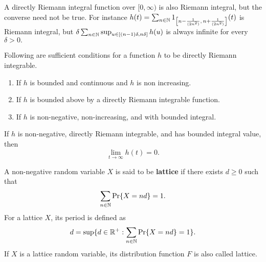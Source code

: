 \documentclass[a4paper,10pt,english]{article}
\begin{document}
A directly Riemann integral function over $[0,\infty)$ is also Riemann integral, but the converse need not be true. For instance $h(t) = \sum_{n\in\mathbb{N}}1_{\left[n-\frac{1}{(2n^2)},\,n+\frac{1}{(2n^2)}\right]}(t)$ is Riemann integral, but $\delta \sum_{n \in \mathbb{N}}\sup_{ u \in [(n-1)\delta,n\delta]}h(u)$ is always infinite for every $\delta>0.$
\begin{prop}%
Following are sufficient conditions for a function $h$ to be directly Riemann integrable.
  \begin{enumerate}
  \item If $h$ is bounded and continuous and $h$ is non increasing. 
  \item If $h$ is bounded above by a directly Riemann integrable function.
	\item If $h$ is non-negative, non-increasing, and with bounded integral.
  \end{enumerate}
\end{prop}
\begin{prop} If $h$ is non-negative, directly Riemann integrable, and has bounded integral value, then 
\begin{equation*}
\lim_{t \rightarrow \infty} h(t)=0.
\end{equation*}
\end{prop}

A non-negative random variable $X$ is said to be \textbf{lattice} if there exists $d \geq 0$ such that 
\begin{equation*}
\sum_{n\in\mathbb{N}}\Pr\{X = nd\} = 1.
\end{equation*}
For a lattice $X$, its period is defined as 
\begin{equation*}
d = \sup\{ d \in\mathbb{R}^+: \sum_{n\in\mathbb{N}}\Pr\{X = nd\} = 1 \}.
\end{equation*}
If $X$ is a lattice random variable, its distribution function $F$ is also called lattice.
\end{document}

